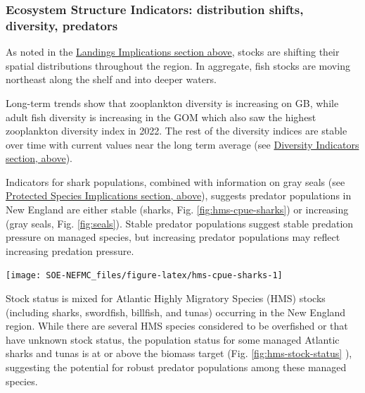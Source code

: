 \documentclass[
  10pt,
]{article}
\let\origfigure\figure
\let\endorigfigure\endfigure
\renewenvironment{figure}[1][2] {
    \expandafter\origfigure\expandafter[H]
} {
    \endorigfigure
}
\begin{document}
\hypertarget{ecosystem-structure-indicators-distribution-shifts-diversity-predators}{%
\subsubsection{Ecosystem Structure Indicators: distribution shifts, diversity, predators}\label{ecosystem-structure-indicators-distribution-shifts-diversity-predators}}

As noted in the \protect\hyperlink{landings}{Landings Implications section above}, stocks are shifting their spatial distributions throughout the region. In aggregate, fish stocks are moving northeast along the shelf and into deeper waters.

Long-term trends show that zooplankton diversity is increasing on GB, while adult fish diversity is increasing in the GOM which also saw the highest zooplankton diversity index in 2022. The rest of the diversity indices are stable over time with current values near the long term average (see \protect\hyperlink{diversity}{Diversity Indicators section, above}).

Indicators for shark populations, combined with information on gray seals (see \protect\hyperlink{protected-species}{Protected Species Implications section, above}), suggests predator populations in New England are either stable (sharks, Fig. \ref{fig:hms-cpue-sharks}) or increasing (gray seals, Fig. \ref{fig:seals}). Stable predator populations suggest stable predation pressure on managed species, but increasing predator populations may reflect increasing predation pressure.

\begin{figure}

{\centering \texttt{[image: SOE-NEFMC\_files/figure-latex/hms-cpue-sharks-1]} 

}

\caption{Estimated number of sharks per unit effort from Highly Migratory Species Pelagic Observer Program data.}\label{fig:hms-cpue-sharks}
\end{figure}

Stock status is mixed for Atlantic Highly Migratory Species (HMS) stocks (including sharks, swordfish, billfish, and tunas) occurring in the New England region. While there are several HMS species considered to be overfished or that have unknown stock status, the population status for some managed Atlantic sharks and tunas is at or above the biomass target (Fig. \ref{fig:hms-stock-status} ), suggesting the potential for robust predator populations among these managed species.
\end{document}
